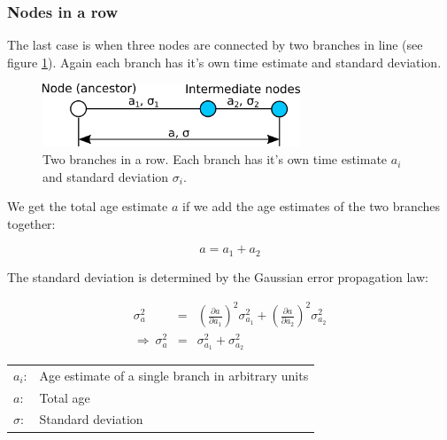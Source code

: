 \subsubsection*{Nodes in a row}

The last case is when three nodes are connected by
two branches in line (see figure \ref{nodes_in_row}).
Again each branch has it's own time estimate and
standard deviation. 

\begin{figure}[ht]
\centering
\includegraphics[width=7.7cm]{img/nodes_in_row.png}
\caption{\label{nodes_in_row} Two branches in a row.
Each branch has it's own time estimate
$a_i$ and standard deviation $\sigma_i$.}
\end{figure}

We get the total age estimate $a$ if we add the age estimates
of the two branches together:

\begin{equation}
a = a_1 + a_2
\end{equation}

The standard deviation is determined by the Gaussian error
propagation law:

\begin{eqnarray}
\sigma_a^2 & = & \left( \frac{\partial a}{\partial a_1} \right)^2 \sigma_{a_1}^2
+ \left( \frac{\partial a}{\partial a_2} \right)^2 \sigma_{a_2}^2\\
\Rightarrow\ \sigma_a^2 & = & \sigma_{a_1}^2 + \sigma_{a_2}^2
\end{eqnarray}

\begin{tabular}{ll}
$a_i$: &  Age estimate of a single branch in arbitrary units\\
$a$: & Total age\\
$\sigma$: &  Standard deviation
\end{tabular}
\vspace{1em}










